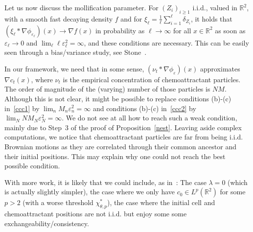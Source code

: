 \documentclass[11pt]{article}
\newcommand{\R}{\mathbb{R}}
\newcommand{\1}{\mathbbm{1}}
\newcommand{\e}{\varepsilon}
\newcommand{\vip}{\vskip5pt}
\begin{document}
\vip 
Let us now discuss the mollification parameter. For $(Z_i)_{i\geq 1}$ i.i.d., valued in $\R^2$, with a smooth fast decaying density $f$ and for $\xi_\ell=\frac1\ell\sum_{i=1}^\ell \delta_{Z_i}$, it holds that $(\xi_\ell \ast \nabla \phi_{\e_\ell})(x) \to \nabla f(x)$ in probability as $\ell\to \infty$ for all $x\in \R^2$ as soon as $\e_\ell\to 0$ 
and $\lim_{\ell} \ell \e_\ell^{2}=\infty$, and these conditions are necessary. This can be easily seen through a bias/variance study, see Stone~\cite{stone}.
\vip

In our framework, we need that in some sense, $(\nu_t\ast \nabla \phi_\e) (x)$ approximates $\nabla c_t(x)$,
where $\nu_t$ is the empirical concentration of chemoattractant particles. The order of magnitude of the (varying) number of those particles is $NM$. Although this is not clear, it might be possible to replace conditions (b)-(c) in~\eqref{ccc1} by $\lim_n M_n \e_n^2=\infty$ and conditions (b)-(c) in~\eqref{ccc2} by  $\lim_N NM_N \e_N^2=\infty$.
We do not see at all how to reach such a weak condition, mainly due to 
Step~3 of the proof of Proposition~\ref{nest}. Leaving aside complex computations, we notice that chemoattractant particles are far from being i.i.d. Brownian motions as they are correlated through their common ancestor and their initial positions. This may explain why one could not reach the best possible condition.

\vip

With more work, it is likely that we could include, as in~\cite{FT1}: The case $\lambda=0$ (which is actually slightly simpler), the case where we only have $c_0 \in L^p(\R^2)$ for some $p>2$ (with a worse threshold $\chi^*_{\theta,p}$), the case where the initial cell and chemoattractant positions are not i.i.d. but enjoy some some exchangeability/consistency.
\end{document}
